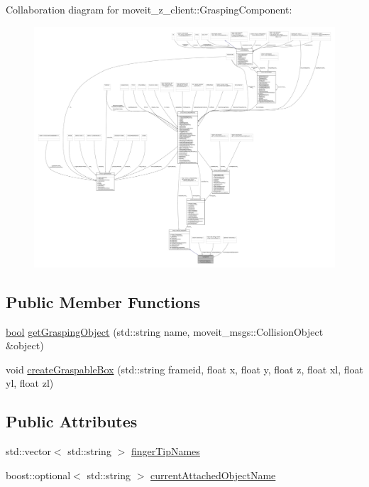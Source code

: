 Collaboration diagram for moveit\+\_\+z\+\_\+client\+:\+:Grasping\+Component\+:
\nopagebreak
\begin{figure}[H]
\begin{center}
\leavevmode
\includegraphics[width=350pt]{classmoveit__z__client_1_1GraspingComponent__coll__graph}
\end{center}
\end{figure}
\subsection*{Public Member Functions}
\begin{DoxyCompactItemize}
\item 
\hyperlink{classbool}{bool} \hyperlink{classmoveit__z__client_1_1GraspingComponent_a791e7cd29d7dcbb85012ea1c5827db22}{get\+Grasping\+Object} (std\+::string name, moveit\+\_\+msgs\+::\+Collision\+Object \&object)
\item 
void \hyperlink{classmoveit__z__client_1_1GraspingComponent_ad480110e1d23a0be14a42cc29acfe3ad}{create\+Graspable\+Box} (std\+::string frameid, float x, float y, float z, float xl, float yl, float zl)
\end{DoxyCompactItemize}
\subsection*{Public Attributes}
\begin{DoxyCompactItemize}
\item 
std\+::vector$<$ std\+::string $>$ \hyperlink{classmoveit__z__client_1_1GraspingComponent_a1a3da6af2dcf6e815042c5d892875412}{finger\+Tip\+Names}
\item 
boost\+::optional$<$ std\+::string $>$ \hyperlink{classmoveit__z__client_1_1GraspingComponent_a963ed612bc569ee45401e38133b802eb}{current\+Attached\+Object\+Name}
\end{DoxyCompactItemize}
